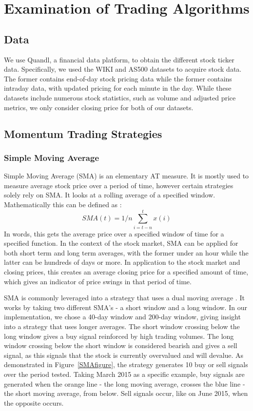 \documentclass[../thesis.tex]{subfiles}
\begin{document}
\chapter{Examination of Trading Algorithms}
\label{ch:specific1}

\section{Data}
We use Quandl, a financial data platform, to obtain the different stock ticker data. Specifically, we used the WIKI and AS500 datasets to acquire stock data. The former contains end-of-day stock pricing data while the former contains intraday data, with updated pricing for each minute in the day. While these datasets include numerous stock statistics, such as volume and adjusted price metrics, we only consider closing price for both of our datasets. 

\section{Momentum Trading Strategies}

\subsection{Simple Moving Average}
Simple Moving Average (SMA) is an elementary AT measure. It is mostly used to measure average stock price over a period of time, however certain strategies solely rely on SMA. It looks at a rolling average of a specified window. Mathematically this can be defined as \cite{AlmeidaTeixeira}:  \[ SMA(t) = 1/n \sum_{i=t-n}^{t}x(i) \]  In words, this gets the average price over a specified window of time for a specified function. In the context of the stock market, SMA can be applied for both short term and long term averages, with the former under an hour while the latter can be hundreds of days or more. In application to the stock market and closing prices, this creates an average closing price for a specified amount of time, which gives an indicator of price swings in that period of time.

SMA is commonly leveraged into a strategy that uses a dual moving average \cite{AlmeidaTeixeira}. It works by taking two different SMA's - a short window and a long window. In our implementation, we chose a 40-day window and 200-day window, giving insight into a strategy that uses longer averages. The short window crossing below the long window gives a buy signal reinforced by high trading volumes. The long window crossing below the short window is considered bearish and gives a sell signal, as this signals that the stock is currently overvalued and will devalue. As demonstrated in Figure~\ref{SMAfigure}, the strategy generates 10 buy or sell signals over the period tested. Taking March 2015 as a specific example, buy signals are generated when the orange line - the long moving average, crosses the blue line - the short moving average, from below. Sell signals occur, like on June 2015, when the opposite occurs.
\end{document}
